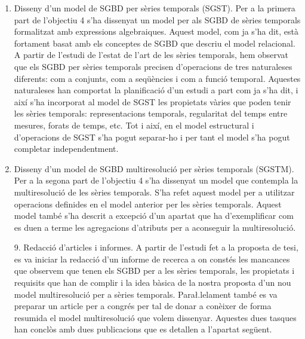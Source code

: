 \begin{enumerate}
\item Disseny d'un model de SGBD per sèries temporals (SGST). Per a la
  primera part de l'objectiu 4 s'ha dissenyat un model per als SGBD de
  sèries temporals formalitzat amb expressions algebraiques. Aquest
  model, com ja s'ha dit, està fortament basat amb els conceptes de
  SGBD que descriu el model relacional. A partir de l'estudi de
  l'estat de l'art de les sèries temporals, hem observat que els SGBD
  per sèries temporals precisen d'operacions de tres naturaleses
  diferents: com a conjunts, com a seqüències i com a funció temporal.
  Aquestes naturaleses han comportat la planificació d'un estudi a
  part com ja s'ha dit, i així s'ha incorporat al model de SGST les
  propietats vàries que poden tenir les sèries temporals:
  representacions temporals, regularitat del temps entre mesures,
  forats de temps, etc. Tot i així, en el model estructural i
  d'operacions de SGST s'ha pogut separar-ho i per tant el model s'ha
  pogut completar independentment.



\item Disseny d'un model de SGBD multiresolució per sèries temporals
  (SGSTM). Per a la segona part de l'objectiu 4 s'ha dissenyat un
  model que contempla la multiresolució de les sèries temporals. S'ha
  refet aquest model per a utilitzar operacions definides en el model
  anterior per les sèries temporals. Aquest model també s'ha descrit a
  excepció d'un apartat que ha d'exemplificar com es duen a terme les
  agregacions d'atributs per a aconseguir la multiresolució.



\item[9.] Redacció d'articles i informes. A partir de l'estudi fet a
  la proposta de tesi, es va iniciar la redacció d'un informe de
  recerca a on constés les mancances que observem que tenen els SGBD
  per a les sèries temporals, les propietats i requisits que han de
  complir i la idea bàsica de la nostra proposta d'un nou model
  multiresolució per a sèries temporals. Para\l.lelament també es va
  preparar un article per a congrés per tal de donar a conèixer de
  forma resumida el model multiresolució que volem dissenyar. Aquestes
  dues tasques han conclòs amb dues publicacions que es detallen a
  l'apartat següent.

\end{enumerate}






\newpage

